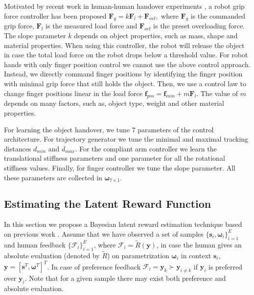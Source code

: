 Motivated by recent work in human-human handover experiments \cite{ChaPar13}, a robot grip force controller \citep{Chan_ICRA_2014} has been proposed $
\boldsymbol{F}_g = k \boldsymbol{F}_l + \boldsymbol{F}_{ovl}, 
$
where $\boldsymbol{F}_g$ is the commanded grip force, $\boldsymbol{F}_l$ is the measured load force and $\boldsymbol{F}_{ovl}$ is the preset overloading force. The slope parameter $k$ depends on object properties, such as mass, shape and material properties. When using this controller, the robot will release the object in case the total load force on the robot drops below a threshold value. For robot hands with only finger position control we cannot use the above control approach. Instead, we directly command finger positions by identifying the finger position with minimal grip force that still holds the object. Then, we use a control law to change finger positions linear in the load force
$\boldsymbol{f}_{pos}= \boldsymbol{f}_{min} + m \boldsymbol{F}_l$. The value of $m$ depends on many factors, such as, object type, weight and other material properties. 

For learning the object handover, we tune $7$ parameters of the control architecture. For trajectory generator we tune the minimal and maximal tracking distances $d_{min}$ and $d_{max}$. For the compliant arm controller we learn the translational stiffness parameters and one parameter for all the rotational stiffness values. Finally, for finger controller we tune the slope parameter. All these parameters are collected in $ {\boldsymbol{\omega}} _{7\times 1}$.

\subsection{Estimating the Latent Reward Function}

In this section we propose a Bayesian latent reward estimation technique based on previous work \citep{Chu_ICML_2005}. Assume that we have observed a set of samples $\{  {\boldsymbol{s}} _i,  {\boldsymbol{\omega}} _i\}_{i=1}^E$ and human feedback $\{\mathcal{F}_i\}_{i=1}^E$, where $\mathcal{F}_i = \tilde{R}(  {\boldsymbol{y}} )$, in case the human gives an absolute evaluation (denoted by $\tilde{R}$) on parametrization $ {\boldsymbol{\omega}} _i$ in context $  {\boldsymbol{s}} _i$, $   {\boldsymbol{y}} = [  {\boldsymbol{s}} ^T,  {\boldsymbol{\omega}} ^T]^T$. In case of preference feedback $\mathcal{F}_i =   {\boldsymbol{y}} _k \succ   {\boldsymbol{y}} _{i\neq k}$ if $  {\boldsymbol{y}} _i$ is preferred over $  {\boldsymbol{y}} _i$. Note that for a given sample there may exist both preference and absolute evaluation.

